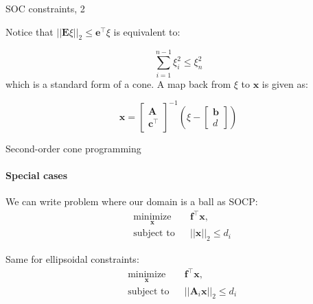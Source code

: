 \documentclass{beamer}
\begin{document}
\begin{frame}{SOC constraints, 2}
	\begin{flushleft}
		
		Notice that $||\mathbf{E}\xi||_2 \leq 
		\mathbf{e}^\top \xi$ is equivalent to:
		
		\begin{equation}
			\sum\limits_{i=1}^{n-1}\xi_i^2 \leq \xi_n^2 
		\end{equation}
%	
	which is a standard form of a cone. A map back from $\xi$ to $\mathbf{x}$ is given as:
	
	\begin{equation}
		\mathbf{x} = \begin{bmatrix}
			\mathbf{A} \\ \mathbf{c}^\top
		\end{bmatrix}^{-1}
	\left(
		\xi - 
		\begin{bmatrix}
			\mathbf{b} \\ d
		\end{bmatrix}
	\right)
	\end{equation}
		
	\end{flushleft}
\end{frame}








\begin{frame}{Second-order cone programming}
\framesubtitle{Special cases}
\begin{flushleft}

We can write problem where our domain is a ball as SOCP:
%
\begin{equation}
\begin{aligned}
& \underset{\mathbf{x}}{\text{minimize}}
& & \mathbf{f}^\top\mathbf{x}, \\
& \text{subject to}
& & ||\mathbf{x}||_2 \leq d_i
\end{aligned}
\end{equation}

\bigskip

Same for ellipsoidal constraints:
%
\begin{equation}
\begin{aligned}
& \underset{\mathbf{x}}{\text{minimize}}
& & \mathbf{f}^\top\mathbf{x}, \\
& \text{subject to}
& & ||\mathbf{A}_i\mathbf{x}||_2 \leq d_i
\end{aligned}
\end{equation}
 
\end{flushleft}
\end{frame}
\end{document}
